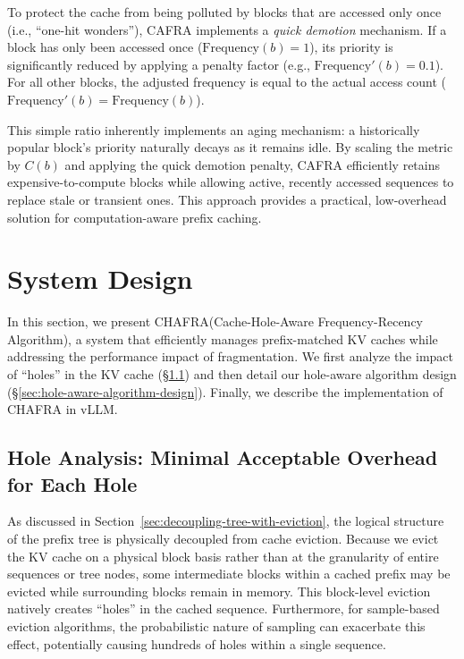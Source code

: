\documentclass[letterpaper,twocolumn,10pt]{article}
\newcommand{\sys}{CHAFRA\xspace}
\newcommand{\sysfull}{Cache-Hole-Aware Frequency-Recency Algorithm\xspace}
\newcommand{\algo}{CAFRA\xspace}
\begin{document}
To protect the cache from being polluted by blocks that are accessed only once (i.e., ``one-hit wonders''), \algo implements a \textit{quick demotion} mechanism. If a block has only been accessed once ($\text{Frequency}(b) = 1$), its priority is significantly reduced by applying a penalty factor (e.g., $\text{Frequency}'(b) = 0.1$). For all other blocks, the adjusted frequency is equal to the actual access count ($\text{Frequency}'(b) = \text{Frequency}(b)$).

This simple ratio inherently implements an aging mechanism: a historically
popular block's priority naturally decays as it remains idle. By scaling
the metric by $C(b)$ and applying the quick demotion penalty, \algo efficiently 
retains expensive-to-compute blocks while allowing active, recently accessed 
sequences to replace stale or transient ones. This approach provides a 
practical, low-overhead solution for computation-aware prefix caching.


\section{System Design}

In this section, we present \sys (\sysfull), a system that efficiently
manages prefix-matched KV caches while addressing the performance impact of
fragmentation. We first analyze the impact of ``holes'' in the KV cache
(\S\ref{sec:hole-analysis}) and then detail our hole-aware algorithm design
(\S\ref{sec:hole-aware-algorithm-design}). Finally, we describe the
implementation of \sys in vLLM.

\subsection{Hole Analysis: Minimal Acceptable Overhead for Each Hole}
\label{sec:hole-analysis}

As discussed in Section~\ref{sec:decoupling-tree-with-eviction}, the logical
structure of the prefix tree is physically decoupled from cache eviction.
Because we evict the KV cache on a physical block basis rather than at the
granularity of entire sequences or tree nodes, some intermediate blocks within
a cached prefix may be evicted while surrounding blocks remain in memory. This
block-level eviction natively creates ``holes'' in the cached sequence.
Furthermore, for sample-based eviction algorithms, the probabilistic nature
of sampling can exacerbate this effect, potentially causing hundreds of
holes within a single sequence.
\end{document}
